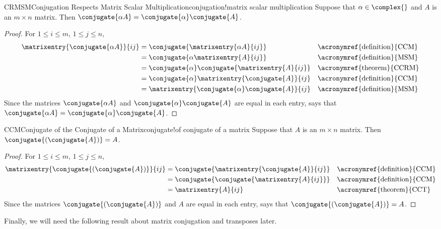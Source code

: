 %
\begin{theorem}{CRMSM}{Conjugation Respects Matrix Scalar Multiplication}{conjugation!matrix scalar multiplication}
Suppose that $\alpha\in\complex{\null}$ and $A$ is an $m\times n$ matrix.  Then $\conjugate{\alpha A}=\conjugate{\alpha}\conjugate{A}$.
\end{theorem}
%
\begin{proof}
%
For $1\leq i\leq m$, $1\leq j\leq n$,
%
\begin{align*}
%
\matrixentry{\conjugate{\alpha A}}{ij}
&=\conjugate{\matrixentry{\alpha A}{ij}}&&\text{\acronymref{definition}{CCM}}\\
&=\conjugate{\alpha\matrixentry{A}{ij}}&&\text{\acronymref{definition}{MSM}}\\
&=\conjugate{\alpha}\conjugate{\matrixentry{A}{ij}}&&\text{\acronymref{theorem}{CCRM}}\\
&=\conjugate{\alpha}\matrixentry{\conjugate{A}}{ij}&&\text{\acronymref{definition}{CCM}}\\
&=\matrixentry{\conjugate{\alpha}\conjugate{A}}{ij}&&\text{\acronymref{definition}{MSM}}
%
\end{align*}
%
Since the matrices  $\conjugate{\alpha A}$ and $\conjugate{\alpha}\conjugate{A}$  are equal in each entry,  says that $\conjugate{\alpha A}=\conjugate{\alpha}\conjugate{A}$.
%
\end{proof}
%
%
\begin{theorem}{CCM}{Conjugate of the Conjugate of a Matrix}{conjugate!of conjugate of a matrix}
Suppose that $A$ is an $m\times n$ matrix.  Then $\conjugate{\left(\conjugate{A}\right)}=A$.
\end{theorem}
%
\begin{proof}
For $1\leq i\leq m$, $1\leq j\leq n$,
%
\begin{align*}
%
\matrixentry{\conjugate{\left(\conjugate{A}\right)}}{ij}
&=\conjugate{\matrixentry{\conjugate{A}}{ij}}&&\text{\acronymref{definition}{CCM}}\\
&=\conjugate{\conjugate{\matrixentry{A}{ij}}}&&\text{\acronymref{definition}{CCM}}\\
&=\matrixentry{A}{ij}&&\text{\acronymref{theorem}{CCT}}%
\end{align*}
%
Since the matrices  $\conjugate{\left(\conjugate{A}\right)}$ and $A$  are equal in each entry,  says that $\conjugate{\left(\conjugate{A}\right)}=A$.
%
\end{proof}
%
Finally, we will need the following result about matrix conjugation and transposes later.
